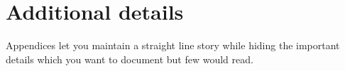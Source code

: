 \chapter{Additional details}
\label{app:details}

Appendices let you maintain a straight line story while hiding the important
details which you want to document but few would read.
